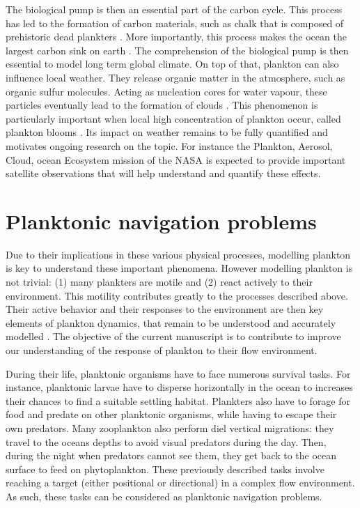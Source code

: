 The biological pump is then an essential part of the carbon cycle.
This process has led to the formation of carbon materials, such as chalk that is composed of prehistoric dead plankters \citep{farouk2020geochemical}.
More importantly, this process makes the ocean the largest carbon sink on earth \citep{lal2008carbon, hinge2020sustainability}.
The comprehension of the biological pump is then essential to model long term global climate. 
On top of that, plankton can also influence local weather.
They release organic matter in the atmosphere, such as organic sulfur molecules.
Acting as nucleation cores for water vapour, these particles eventually lead to the formation of clouds \citep{charlson1987oceanic, szyrmer1997biogenic}.
This phenomenon is particularly important when local high concentration of plankton occur, called plankton blooms \citep{behrenfeld2014resurrecting, park2017observational, creamean2019ice}.
Its impact on weather remains to be fully quantified \citep{quinn2011case} and motivates ongoing research on the topic.
For instance the Plankton, Aerosol, Cloud, ocean Ecosystem mission of the NASA \citep{werdell2019plankton} is expected to provide important satellite observations that will help understand and quantify these effects.

\section{Planktonic navigation problems}

Due to their implications in these various physical processes, modelling plankton is key to understand these important phenomena.
However modelling plankton is not trivial: (1) many plankters are motile and (2) react actively to their environment.
This motility contributes greatly to the processes described above.
Their active behavior and their responses to the environment are then key elements of plankton dynamics, that remain to be understood and accurately modelled \citep{franks2022oceanic}.
The objective of the current manuscript is to contribute to improve our understanding of the response of plankton to their flow environment. 

During their life, planktonic organisms have to face numerous survival tasks.
For instance, planktonic larvae have to disperse horizontally in the ocean to increases their chances to find a suitable settling habitat.
Plankters also have to forage for food and predate on other planktonic organisms, while having to escape their own predators.
Many zooplankton also perform diel vertical migrations: they travel to the oceans depths to avoid visual predators during the day.
Then, during the night when predators cannot see them, they get back to the ocean surface to feed on phytoplankton.
These previously described tasks involve reaching a target (either positional or directional) in a complex flow environment.
As such, these tasks can be considered as planktonic navigation problems.

